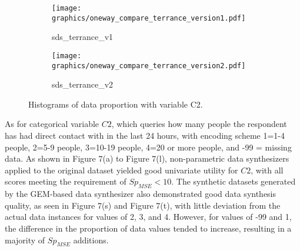 \newpage
\begin{figure}[H]\ContinuedFloat
\begin{center}
    \begin{subfigure}{0.32\textwidth}
        \centering
        \texttt{[image: graphics/oneway\_compare\_terrance\_version1.pdf]}  
        \caption{sds\_terrance\_v1}
        \label{subfig:terrancev1c2}
    \end{subfigure}
    \begin{subfigure}{0.32\textwidth}
        \centering
        \texttt{[image: graphics/oneway\_compare\_terrance\_version2.pdf]}  
        \caption{sds\_terrance\_v2}
        \label{subfig:terrancev2c2}
    \end{subfigure}
\end{center}
    \caption[]{Histograms of data proportion with variable C2.}
    \label{fig:c2-3}
\end{figure}
As for categorical variable $C2$, which queries how many people the respondent has had direct contact with in the last 24 hours, with encoding scheme 1=1-4 people, 2=5-9 people, 3=10-19 people, 4=20 or more people, and -99 = missing data. As shown in Figure 7(a) to Figure 7(l), non-parametric data synthesizers applied to the original dataset yielded good univariate utility for $C2$, with all scores meeting the requirement of $Sp_{MSE}<10$. The synthetic datasets generated by the GEM-based data synthesizer also demonstrated good data synthesis quality, as seen in Figure 7(s) and Figure 7(t), with little deviation from the actual data instances for values of 2, 3, and 4. However, for values of -99 and 1, the difference in the proportion of data values tended to increase, resulting in a majority of $Sp_{MSE}$ additions.

